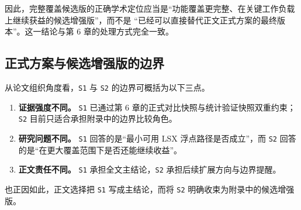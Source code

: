 因此，完整覆盖候选版的正确学术定位应当是“功能覆盖更完整、在关键工作负载上继续获益的候选增强版”，而不是
“已经可以直接替代正文正式方案的最终版本”。这一结论与第 6 章的处理方式完全一致。

\subsection{正式方案与候选增强版的边界}

从论文组织角度看，\texttt{S1} 与 \texttt{S2} 的边界可概括为以下三点。

\begin{enumerate}
    \item \textbf{证据强度不同。} \texttt{S1} 已通过第 6 章的正式对比快照与统计验证快照双重约束；
    \texttt{S2} 目前只适合承担附录中的边界比较角色。
    \item \textbf{研究问题不同。} \texttt{S1} 回答的是“最小可用 LSX 浮点路径是否成立”，而 \texttt{S2}
    回答的是“在更大覆盖范围下是否还能继续收益”。
    \item \textbf{正文责任不同。} \texttt{S1} 承担全文主结论，\texttt{S2} 承担后续扩展方向与边界提醒。
\end{enumerate}

也正因如此，正文选择把 \texttt{S1} 写成主结论，而将 \texttt{S2} 明确收束为附录中的候选增强版。
